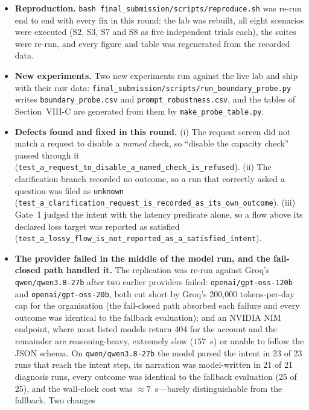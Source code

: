 \documentclass[11pt,a4paper]{article}
\begin{document}
\begin{itemize}
  \item \textbf{Reproduction.} \texttt{bash final\_submission/scripts/reproduce.sh}
    was re-run end to end with every fix in this round: the lab was
    rebuilt, all eight scenarios were executed (S2, S3, S7 and S8 as five
    independent trials each), the suites were re-run, and every figure and
    table was regenerated from the recorded data.
  \item \textbf{New experiments.} Two new experiments run against the live
    lab and ship with their raw data:
    \texttt{final\_submission/scripts/run\_boundary\_probe.py} writes
    \texttt{boundary\_probe.csv} and \texttt{prompt\_robustness.csv}, and
    the tables of Section~VIII-C are generated from them by
    \texttt{make\_probe\_table.py}.
  \item \textbf{Defects found and fixed in this round.} (i) The request
    screen did not match a request to disable a \emph{named} check, so
    ``disable the capacity check'' passed through it
    (\texttt{test\_a\_request\_to\_disable\_a\_named\_check\_is\_refused}).
    (ii) The clarification branch recorded no outcome, so a run that
    correctly asked a question was filed as \texttt{unknown}
    (\texttt{test\_a\_clarification\_request\_is\_recorded\_as\_its\_own\_outcome}).
    (iii) Gate~1 judged the intent with the latency predicate alone, so a
    flow above its declared loss target was reported as satisfied
    (\texttt{test\_a\_lossy\_flow\_is\_not\_reported\_as\_a\_satisfied\_intent}).
  \item \textbf{The provider failed in the middle of the model run, and
    the fail-closed path handled it.} The replication was re-run against
    Groq's \texttt{qwen/qwen3.8-27b} after two earlier providers failed:
    \texttt{openai/gpt-oss-120b} and \texttt{openai/gpt-oss-20b}, both
    cut short by Groq's 200,000 tokens-per-day cap for the organisation
    (the fail-closed path absorbed each failure and every outcome was
    identical to the fallback evaluation); and an NVIDIA NIM endpoint,
    where most listed models return 404 for the account and the remainder
    are reasoning-heavy, extremely slow ($157$~s) or unable to follow the
    JSON schema. On \texttt{qwen/qwen3.8-27b} the model parsed the intent
    in 23 of 23 runs that reach the intent step, its narration was
    model-written in 21 of 21 diagnosis runs, every outcome was identical
    to the fallback evaluation (25 of 25), and the wall-clock cost was
    $\approx 7$~s---barely distinguishable from the fallback. Two changes

\end{itemize}
\end{document}

